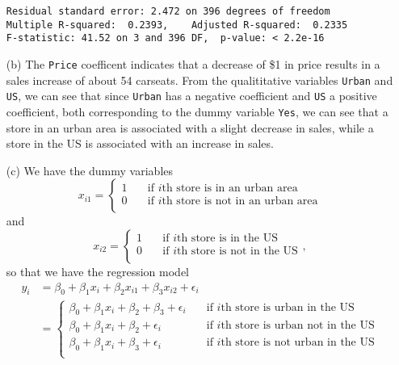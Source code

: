 \begin{itemize}
\begin{verbatim}
Residual standard error: 2.472 on 396 degrees of freedom
Multiple R-squared:  0.2393,    Adjusted R-squared:  0.2335 
F-statistic: 41.52 on 3 and 396 DF,  p-value: < 2.2e-16
        \end{verbatim}\normalsize
    \item[(b)] The \verb|Price| coefficent indicates that a decrease of \$1 in price
        results in a sales increase of about 54 carseats. From the qualititative
        variables \verb|Urban| and \verb|US|, we can see that since \verb|Urban| 
        has a negative coefficient and \verb|US| a positive coefficient, both
        corresponding to the dummy variable \verb|Yes|, we can see that a store in
        an urban area is associated with a slight decrease in sales, while a store 
        in the US is associated with an increase in sales.
    \item[(c)] We have the dummy variables 
        \[
            x_{i1} = 
            \begin{cases}
                1 \quad &\text{if $i$th store is in an urban area} \\
                0 \quad &\text{if $i$th store is not in an urban area} \\
            \end{cases}
        \]
        and
        \[
            x_{i2} = 
            \begin{cases}
                1 \quad &\text{if $i$th store is in the US} \\
                0 \quad &\text{if $i$th store is not in the US} \\
            \end{cases},
        \]
        so that we have the regression model
        \begin{equation*}
            \begin{split}
                y_i &= \beta_0 + \beta_1 x_i + \beta_2 x_{i1} + \beta_3 x_{i2} + \epsilon_i \\
                &=
                \begin{cases}
                    \beta_0 + \beta_1x_i + \beta_2 + \beta_3 + \epsilon_i \quad 
                        &\text{if $i$th store is urban in the US} \\
                    \beta_0 + \beta_1x_i + \beta_2 + \epsilon_i \quad 
                        &\text{if $i$th store is urban not in the US} \\
                    \beta_0 + \beta_1x_i + \beta_3 + \epsilon_i \quad 
                        &\text{if $i$th store is not urban in the US} \\

\end{cases}
\end{split}
\end{equation*}
\end{itemize}
